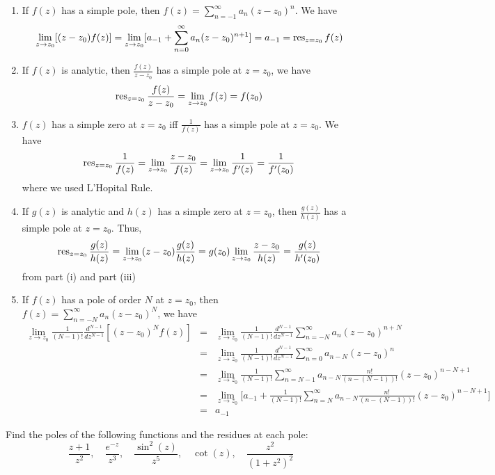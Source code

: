\documentclass[a4paper]{article}
\begin{document}
\begin{ans}\leavevmode
\begin{enumerate}[label=(\roman*)]
\item If $f(z)$ has a simple pole, then $f(z)=\sum_{n=-1}^\infty a_n(z-z_0)^n$. We have $$\lim_{z\rightarrow z_0}[(z-z_0)f(z)]=\lim_{z\rightarrow z_0}[a_{-1}+\sum_{n=0}^\infty a_n(z-z_0)^{n+1}]=a_{-1}=\operatorname{res}_{z=z_0}f(z)$$
    \item If $f(z)$ is analytic, then $\frac{f(z)}{z-z_0}$ has a simple pole at $z=z_0$, we have
    $$\operatorname{res}_{z=z_0}\frac{f(z)}{z-z_0}=\lim_{z\rightarrow z_0}f(z)=f(z_0)$$
    \item $f(z)$ has a simple zero at $z=z_0$ iff $\frac{1}{f(z)}$ has a simple pole at $z=z_0$. We have
    $$\operatorname{res}_{z=z_0}\frac{1}{f(z)}=\lim_{z\rightarrow z_0}\frac{z-z_0}{f(z)}=\lim_{z\rightarrow z_0}\frac{1}{f'(z)}=\frac{1}{f'(z_0)}$$
    where we used L'Hopital Rule.
    \item If $g(z)$ is analytic and $h(z)$ has a simple zero at $z=z_0$, then $\frac{g(z)}{h(z)}$ has a simple pole at $z=z_0$. Thus,
    $$\operatorname{res}_{z=z_0}\frac{g(z)}{h(z)}=\lim_{z\rightarrow z_0}(z-z_0)\frac{g(z)}{h(z)}=g(z_0)\lim_{z\rightarrow z_0}\frac{z-z_0}{h(z)}=\frac{g(z)}{h'(z_0)}$$
    from part (i) and part (iii)
    \item If $f(z)$ has a pole of order $N$ at $z=z_0$, then $f(z)=\sum_{n=-N}^\infty a_n(z-z_0)^N$, we have
    \begin{eqnarray}
    \lim_{z\rightarrow z_0}\frac{1}{(N-1)!}\frac{d^{N-1}}{dz^{N-1}}[(z-z_0)^Nf(z)]&=&\lim_{z\rightarrow z_0}\frac{1}{(N-1)!}\frac{d^{N-1}}{dz^{N-1}}\sum_{n=-N}^\infty a_n(z-z_0)^{n+N}\nonumber\\&=&\lim_{z\rightarrow z_0}\frac{1}{(N-1)!}\frac{d^{N-1}}{dz^{N-1}}\sum_{n=0}^\infty a_{n-N}(z-z_0)^n\nonumber\\&=&\lim_{z\rightarrow z_0}\frac{1}{(N-1)!}\sum_{n=N-1}^\infty a_{n-N}\frac{n!}{(n-(N-1))!}(z-z_0)^{n-N+1}\nonumber\\&=&\lim_{z\rightarrow z_0}\bigg[a_{-1}+\frac{1}{(N-1)!}\sum_{n=N}^\infty a_{n-N}\frac{n!}{(n-(N-1))!}(z-z_0)^{n-N+1}\bigg]\nonumber\\&=&a_{-1}\nonumber
    \end{eqnarray}
\end{enumerate}
\end{ans}
\newpage
\begin{qns}
Find the poles of the following functions and the residues at each pole:
$$\frac{z+1}{z^2},\quad\frac{e^{-z}}{z^3},\quad\frac{\sin^2(z)}{z^5},\quad\cot(z),\quad\frac{z^2}{(1+z^2)^2}$$
\end{qns}
\end{document}
